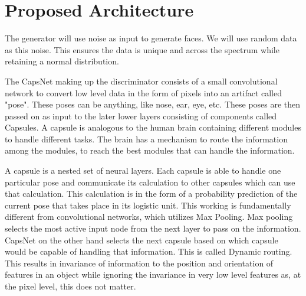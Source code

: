 \documentclass{vldb}
\begin{document}
\section{Proposed Architecture}
The generator will use noise as input to generate faces. We will use random data as this noise. This ensures the data is unique and across the spectrum while retaining a normal distribution.
\par\bigskip

The CapsNet making up the discriminator consists of a small convolutional network to convert low level data in the form of pixels into an artifact called "pose". These poses can be anything, like nose, ear, eye, etc. These poses are then passed on as input to the later lower layers consisting of components called Capsules. A capsule is analogous to the human brain containing different modules to handle different tasks. The brain has a mechanism to route the information among the modules, to reach the best modules that can handle the information.
\par\bigskip

A capsule is a nested set of neural layers. Each capsule is able to handle one particular pose and communicate its calculation to other capsules which can use that calculation. This calculation is in the form of a probability prediction of the current pose that takes place in its logistic unit. This working is fundamentally different from convolutional networks, which utilizes Max Pooling. Max pooling selects the most active input node from the next layer to pass on the information. CapsNet on the other hand selects the next capsule based on which capsule would be capable of handling that information. This is called Dynamic routing. This results in invariance of information to the position and orientation of features in an object while ignoring the invariance in very low level features as, at the pixel level, this does not matter.
\par\bigskip
\end{document}
